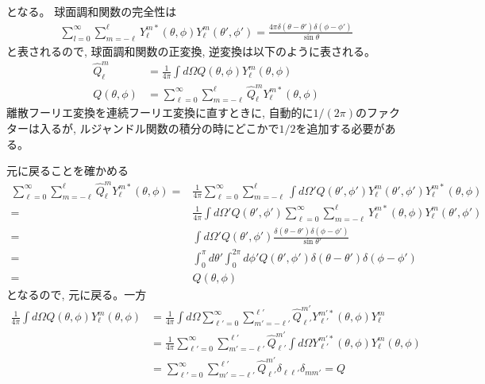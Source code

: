 \documentclass[a4j, 12pt]{ltjarticle}
\begin{document}
    となる。
    球面調和関数の完全性は
    \begin{align}
        \sum_{l=0}^{\infty} \sum_{m=-\ell}^{\ell} Y_\ell^{m*}(\theta,\phi)
        Y_\ell^m(\theta',\phi') = \frac{4\pi\delta(\theta - \theta')\delta(\phi - \phi')}{\sin\theta}
    \end{align}
    と表されるので, 球面調和関数の正変換, 逆変換は以下のように表される。
    \begin{align}
        \widehat{Q}_\ell^m &= 
        \frac{1}{4\pi}\int d\Omega Q(\theta,\phi) Y_\ell^m(\theta,\phi) \\
        Q(\theta,\phi) &=\sum_{\ell=0}^\infty \sum_{m=-\ell}^\ell \widehat{Q}_\ell^m 
        Y_\ell^{m*}(\theta,\phi)
    \end{align}
    離散フーリエ変換を連続フーリエ変換に直すときに, 自動的に$1/(2\pi)$のファクターは入るが, ルジャンドル関数の積分の時にどこかで$1/2$を追加する必要がある。
    \par
    元に戻ることを確かめる
    \begin{align}
        \sum_{\ell=0}^\infty \sum_{m=-\ell}^\ell \widehat{Q}_\ell^m 
        Y_\ell^{m*}(\theta,\phi) =&
        \frac{1}{4\pi}\sum_{\ell=0}^\infty \sum_{m=-\ell}^\ell  \int d\Omega' Q(\theta',\phi') Y_\ell^m(\theta',\phi')
        Y_\ell^{m*}(\theta,\phi) \\
        =& \frac{1}{4\pi}\int d\Omega' Q(\theta',\phi') \sum_{\ell=0}^\infty
        \sum_{m=-\ell}^\ell  Y_\ell^{m*}(\theta,\phi)
        Y_\ell^m(\theta',\phi') \\
        =& \int d\Omega' Q(\theta',\phi')\frac{\delta(\theta-\theta')\delta(\phi-\phi')}{\sin\theta'} \\
        =& \int_0^\pi d\theta' \int_0^{2\pi} d\phi'Q(\theta',\phi')\delta(\theta-\theta')\delta(\phi-\phi') \\
        =& Q(\theta,\phi)
    \end{align}
    となるので, 元に戻る。一方
    \begin{align}
        \frac{1}{4\pi}\int d\Omega Q(\theta,\phi)Y_\ell^m(\theta,\phi)
        &= \frac{1}{4\pi}\int d\Omega\sum_{\ell'=0}^\infty \sum_{m'=-\ell'}^{\ell'} \widehat{Q}_{\ell'}^{m'}
        Y_{\ell'}^{m'*}(\theta,\phi) Y_\ell^m \\
        &= \frac{1}{4\pi}\sum_{\ell'=0}^\infty \sum_{m'=-\ell'}^{\ell'} \widehat{Q}_{\ell'}^{m'}
        \int d\Omega Y_{\ell'}^{m'*}(\theta,\phi) Y_\ell^m(\theta,\phi) \\
        &=\sum_{\ell'=0}^\infty \sum_{m'=-\ell'}^{\ell'} \widehat{Q}_{\ell'}^{m'}
        \delta_{\ell\ell'}\delta_{mm'} = Q
    \end{align}
    
\end{document}
